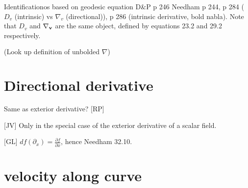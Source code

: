 \documentclass{article}
\begin{document}
Identificationos based on geodesic equation
D\&P p 246
Needham p 244, p 284 ($D_v$ (intrinsic) vs $\nabla_v$ (directional)), p 286
(intrinsic derivative, bold nabla).  Note that $D_v$ and $\bf{\nabla}_v$ are the
same object, defined by equations 23.2 and 29.2 respectively.

(Look up definition of unbolded $\nabla$)

\section{Directional derivative}

Same as exterior derivative? [RP]

[JV] Only in the special case of the exterior derivative of a scalar field.

[GL] $df(\partial_x) = \frac{\partial f}{\partial x}$, hence Needham 32.10.


\section{velocity along curve}
\end{document}
